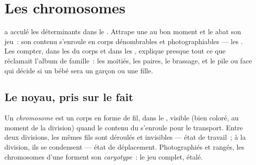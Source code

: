 \chapter{Les chromosomes}\label{ch:g9:chromosomes}

 a acculé les
déterminants dans le . Attrape une  au bon
moment et le  abat son jeu~: son contenu s'enroule en
corps dénombrables et photographiables --- les .
Les compter, dans les  du corps et dans les
, explique presque tout ce que réclamait l'album de
famille~: les moitiés, les paires, le brassage, et le pile
ou face qui décide si un bébé sera un garçon ou une fille.

\section{Le noyau, pris sur le fait}

\begin{definition}\label{def:g9:chromosomes:chromosomes}
Un \emph{chromosome} est un corps en forme
de fil, dans le , visible (bien coloré, au moment de
la division) quand le contenu du  s'enroule pour le
transport. Entre deux divisions, les mêmes fils sont
déroulés et invisibles --- état de travail~; à la division,
ils se condensent --- état de déplacement. Photographiés et
rangés, les chromosomes d'une  forment son
\emph{caryotype}~: le jeu complet, étalé.
\end{definition}

